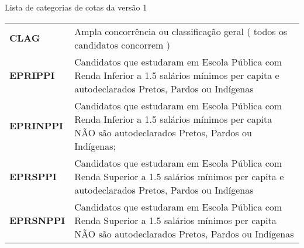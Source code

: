 \begin{quadro}
\caption{Lista de categorias de cotas da versão 1}
\label{quadro_categoriasv1}
\centering
\begin{tabular}{ l l }
   \cline{1-1}\cline{2-2}  
    \multicolumn{1}{|p{5.850cm}|}{\textbf{CLAG}} &
    \multicolumn{1}{p{8.217cm}|}{Ampla concorrência ou classificação geral 
( todos os candidatos concorrem )}
  \\ 
   \cline{1-1}\cline{2-2}  
    \multicolumn{1}{|p{5.850cm}|}{\textbf{EPRIPPI}} &
    \multicolumn{1}{p{8.217cm}|}{Candidatos que estudaram em Escola Pública com Renda Inferior a 1.5 salários mínimos per capita e autodeclarados Pretos, Pardos ou Indígenas}
  \\    
   \cline{1-1}\cline{2-2}  
    \multicolumn{1}{|p{5.850cm}|}{\textbf{EPRINPPI}} &
    \multicolumn{1}{p{8.217cm}|}{Candidatos que estudaram em Escola Pública com Renda Inferior a 1.5 salários mínimos per capita NÃO são autodeclarados Pretos, Pardos ou Indígenas; }
  \\    
   \cline{1-1}\cline{2-2}  
    \multicolumn{1}{|p{5.850cm}|}{\textbf{EPRSPPI}} &
    \multicolumn{1}{p{8.217cm}|}{Candidatos que estudaram em Escola Pública com Renda Superior a 1.5 salários mínimos per capita e autodeclarados Pretos, Pardos ou Indígenas}
  \\     
   \cline{1-1}\cline{2-2}  
    \multicolumn{1}{|p{5.850cm}|}{\textbf{EPRSNPPI}} &
    \multicolumn{1}{p{8.217cm}|}{Candidatos que estudaram em Escola Pública com Renda Superior a 1.5 salários mínimos per capita NÃO são autodeclarados Pretos, Pardos ou Indígenas}
  \\       
  \hline

 \end{tabular} 
\end{quadro}

